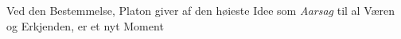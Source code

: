 \documentclass[12pt,a4paper]{book}
\newcommand{\divrule}{\begin{center}\rule{2cm}{0.4pt}\end{center}}
\newcommand{\gk}[1]{\textit{#1}}
\begin{document}
Ved den Bestemmelse, Platon giver af den høieste Idee
som \emph{Aarsag} til al Væren og Erkjenden, er et nyt Moment
\end{document}
